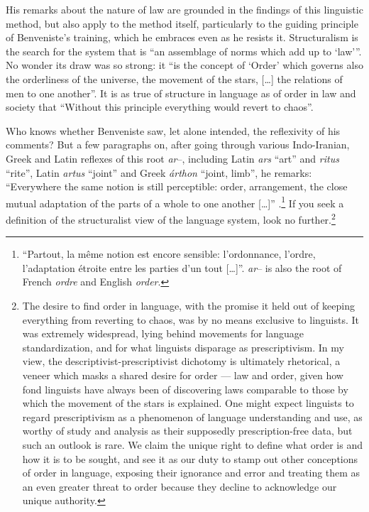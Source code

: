 \documentclass[output=paper]{langscibook}
\begin{document}
His remarks about the nature of law are grounded in the findings of this linguistic method, but also apply to the method itself, particularly to the guiding principle of Benveniste's training, which he embraces even as he resists it. Structuralism is the search for the system that is ``an assemblage of norms which add up to `law'\thinspace''. No wonder its draw was so strong: it ``is the concept of `Order' which governs also the orderliness of the universe, the movement of the stars, […] the relations of men to one another''. It is as true of structure in language as of order in law and society that ``Without this principle everything would revert to chaos''.

Who knows whether Benveniste saw, let alone intended, the reflexivity of his comments? But a few paragraphs on, after going through various Indo-Iranian, Greek and Latin reflexes of this root \emph{ar}--, including Latin \emph{ars} ``art'' and \emph{ritus} ``rite'', Latin \emph{artus} ``joint'' and Greek \emph{árthon} ``joint, limb'', he remarks: ``Everywhere the same notion is still perceptible: order, arrangement, the close mutual adaptation of the parts of a whole to one another […]'' \citep[101]{Benveniste1969vocabulaire}.\footnote{``Partout, la même notion est encore sensible: l'ordonnance, l'ordre, l'adaptation étroite entre les parties d'un tout […]''. \emph{ar}-- is also the root of French \emph{ordre} and English \emph{order}.} If you seek a definition of the structuralist view of the language system, look no further.\footnote{The desire to find order in language, with the promise it held out of keeping everything from reverting to chaos, was by no means exclusive to linguists. It was extremely widespread, lying behind movements for language standardization, and for what linguists disparage as prescriptivism. In my view, the descriptivist-prescriptivist dichotomy is ultimately rhetorical, a veneer which masks a shared desire for order — law and order, given how fond linguists have always been of discovering laws comparable to those by which the movement of the stars is explained. One might expect linguists to regard prescriptivism as a phenomenon of language understanding and use, as worthy of study and analysis as their supposedly prescription-free data, but such an outlook is rare. We claim the unique right to define what order is and how it is to be sought, and see it as our duty to stamp out other conceptions of order in language, exposing their ignorance and error and treating them as an even greater threat to order because they decline to acknowledge our unique authority.}
\end{document}
